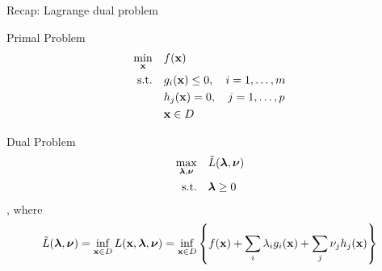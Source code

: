 \documentclass[12pt,notes,mathserif]{beamer}
\begin{document}
\begin{frame}
	{Recap: Lagrange dual problem}
	\begin{block}{Primal Problem}
		\vspace{-1em}
		\begin{equation}
			\begin{aligned}
				\min_{\mathbf{x}}   \quad    & f(\mathbf{x})                           \\
				\textrm{s.t.} \quad & g_i(\mathbf{x}) \le 0,\quad i=1,\dots,m \\
				                    & h_j(\mathbf{x}) =0 ,\quad j=1,\dots, p  \\
				                    & \mathbf{x} \in D                        \\
			\end{aligned}
		\end{equation}
	\end{block}
	\begin{block}{Dual Problem}
		\vspace{-1em}
		\begin{equation}
			\begin{aligned}
				\max_{\boldsymbol{\lambda}, \boldsymbol{\nu}}   \quad    & \tilde{L}( \boldsymbol{\lambda}, \boldsymbol{\nu}) \\
				\textrm{s.t.} \quad & \boldsymbol{\lambda} \ge 0             \\
			\end{aligned}
		\end{equation}
		, where
		\vspace{-1em}
		\begin{equation*}
			\tilde{L}(\boldsymbol{\lambda}, \boldsymbol{\nu} ) =  \inf_{\mathbf{x} \in D} L(\mathbf{x}, \boldsymbol{\lambda}, \boldsymbol{\nu})
			= \inf_{\mathbf{x} \in D} \left\{ f(\mathbf{x})+  \sum_i \lambda_i g_i(\mathbf{x}) + \sum_j \nu_j h_j(\mathbf{x}) \right\}
		\end{equation*}
	\end{block}
\end{frame}
\end{document}
